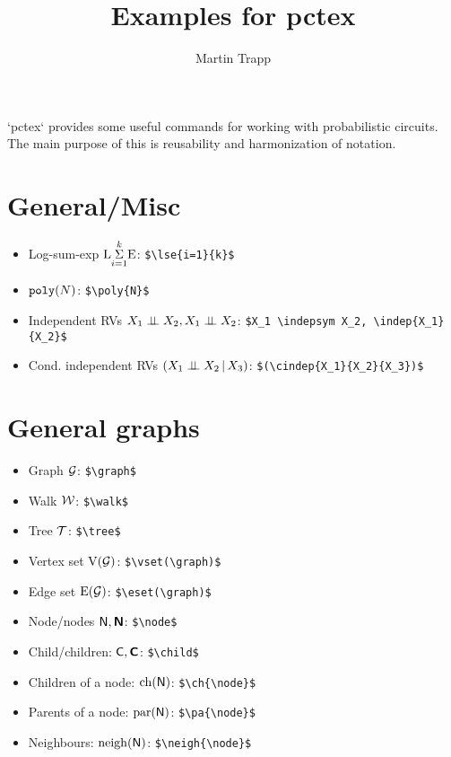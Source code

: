 \documentclass[11pt]{article}
\title{Examples for pctex}
\author{ Martin Trapp }
\date{}
\begin{document}
\maketitle

\noindent
`pctex` provides some useful commands for working with probabilistic circuits. The main purpose of this is reusability and harmonization of notation.

\section{General/Misc}
\begin{itemize}
	\item Log-sum-exp $\lse{i=1}{k}$: \verb!$\lse{i=1}{k}$!
	\item $\poly{N}$: \verb!$\poly{N}$!
	\item Independent RVs $X_1 \indepsym X_2, \indep{X_1}{X_2}$: \verb!$X_1 \indepsym X_2, \indep{X_1}{X_2}$!
	\item Cond. independent RVs $(\cindep{X_1}{X_2}{X_3})$: \verb!$(\cindep{X_1}{X_2}{X_3})$!
\end{itemize}

\section{General graphs}
\begin{itemize}
	\item Graph $\graph$: \verb!$\graph$!
	\item Walk $\walk$: \verb!$\walk$!
	\item Tree $\tree$: \verb!$\tree$!
	\item Vertex set $\vset(\graph)$: \verb!$\vset(\graph)$!
	\item Edge set $\eset(\graph)$: \verb!$\eset(\graph)$!
	\item Node/nodes $\node, \nodes$: \verb!$\node$!
	\item Child/children: $\cnode, \cnodes$: \verb!$\child$!
	\item Children of a node: $\ch{\node}$: \verb!$\ch{\node}$!
	\item Parents of a node: $\pa{\node}$: \verb!$\pa{\node}$!
	\item Neighbours: $\neigh{\node}$: \verb!$\neigh{\node}$!
\end{itemize}
\end{document}
